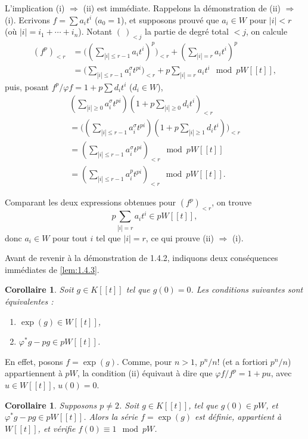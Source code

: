 \documentclass[12pt,a4paper]{article}
\theoremstyle{plain}
\newtheorem{corollary}[theorem]{Corollaire}
\theoremstyle{definition}
\theoremstyle{remark}
\begin{document}
L'implication (i) $\Rightarrow$ (ii) est imm\'ediate. Rappelons la d\'emonstration de (ii) $\Rightarrow$ (i). Ecrivons $f = \sum a_i t^i$ ($a_0 = 1$), et supposons prouv\'e que $a_i \in W$ pour $|i| < r$ (o\`u $|i| = i_1 + \cdots + i_n$). Notant $(~)_{<j}$ la partie de degr\'e total $< j$, on calcule
\begin{align*}
(f^p)_{<r} &= \bigl((\sum_{|i|\leqslant r-1} a_i t^i)^p\bigr)_{<r} + (\sum_{|i|=r} a_i t^i)^p \\
&= \bigl(\sum_{|i|\leqslant r-1} a_i^\sigma t^{pi}\bigr)_{<r} + p\sum_{|i|=r} a_i t^i \mod pW[[t]],
\end{align*}
puis, posant $f^p/\varphi f = 1 + p\sum d_i t^i$ ($d_i \in W$),
\begin{multline*}
(\sum_{|i|\geqslant 0} a_i^\sigma t^{pi})(1 + p\sum_{|i|\geqslant 0} d_i t^i)_{<r} \\
= \bigl((\sum_{|i|\leqslant r-1} a_i^\sigma t^{pi})(1 + p\sum_{|i|\geqslant 1} d_i t^i)\bigr)_{<r} \\
= (\sum_{|i|\leqslant r-1} a_i^\sigma t^{pi})_{<r} \mod pW[[t]] \\
= (\sum_{|i|\leqslant r-1} a_i^p t^{pi})_{<r} \mod pW[[t]].
\end{multline*}

Comparant les deux expressions obtenues pour $(f^p)_{<r}$, on trouve
\[
p\sum_{|i|=r} a_i t^i \in pW[[t]],
\]
donc $a_i \in W$ pour tout $i$ tel que $|i| = r$, ce qui prouve (ii) $\Rightarrow$ (i).

Avant de revenir \`a la d\'emonstration de 1.4.2, indiquons deux cons\'equences imm\'ediates de \ref{lem:1.4.3}.

\begin{corollary}\label{cor:1.4.4}
Soit $g \in K[[t]]$ tel que $g(0) = 0$. Les conditions suivantes sont \'equivalentes :
\begin{enumerate}[label=(\roman*)]
\item $\exp(g) \in W[[t]]$,
\item $\varphi^*g - pg \in pW[[t]]$.
\end{enumerate}
\end{corollary}

En effet, posons $f = \exp(g)$. Comme, pour $n > 1$, $p^n/n!$ (et a fortiori $p^n/n$) appartiennent \`a $pW$, la condition (ii) \'equivaut \`a dire que $\varphi f/f^p = 1 + pu$, avec $u \in W[[t]]$, $u(0) = 0$.

\begin{corollary}\label{cor:1.4.5}
Supposons $p \neq 2$. Soit $g \in K[[t]]$, tel que $g(0) \in pW$, et $\varphi^*g - pg \in pW[[t]]$. Alors la s\'erie $f = \exp(g)$ est d\'efinie, appartient \`a $W[[t]]$, et v\'erifie $f(0) \equiv 1 \mod pW$.
\end{corollary}
\end{document}

